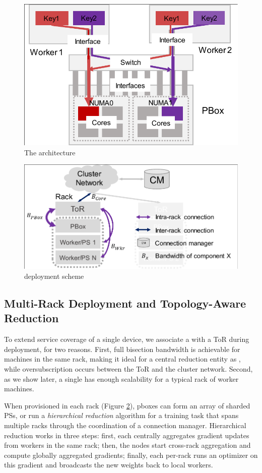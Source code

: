 \begin{figure}[t!]
	\centering
	\includegraphics[width=.6\linewidth,trim=2 1 1 1,clip]{Figures/PHubOverview.pdf}
	\caption{The \pbox architecture}
	\label{fig:phub}
\end{figure}



\begin{figure}[t!]
	\centering
	\includegraphics[width=.7\linewidth,trim=3 1 1 2,clip]{Figures/PBoxDeployment.pdf}
	\caption{\pbox deployment scheme}
	\label{fig:pBoxDeployment}
\end{figure}


\subsection{Multi-Rack Deployment and Topology-Aware Reduction}
\label{sec:hierarchicalReduction}
To extend service coverage of a single \pbox device, we associate a \pbox with a ToR during deployment, for two reasons. First, full bisection bandwidth is achievable for machines in the same rack, making it ideal for a central reduction entity as \pbox, while oversubscription occurs between the ToR and the cluster network. Second, as we show later, a single \pbox has enough scalability for a typical rack of worker machines.

When provisioned in each rack (Figure \ref{fig:pBoxDeployment}), pbox{}es can form an array of sharded PSs, or run a \textit{hierarchical reduction} algorithm for a training task that spans multiple racks through the coordination of a connection manager. Hierarchical reduction works in three steps: first, each \pbox centrally aggregates gradient updates from workers in the same rack; then, the \pbox{} nodes start cross-rack aggregation and compute globally aggregated gradients; finally, each per-rack \pbox runs an optimizer on this gradient and broadcasts the new weights back to local workers.

